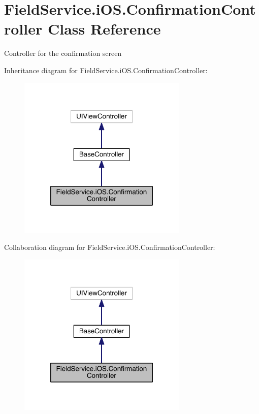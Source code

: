 \hypertarget{class_field_service_1_1i_o_s_1_1_confirmation_controller}{\section{Field\+Service.\+i\+O\+S.\+Confirmation\+Controller Class Reference}
\label{class_field_service_1_1i_o_s_1_1_confirmation_controller}
}


Controller for the confirmation screen  




Inheritance diagram for Field\+Service.\+i\+O\+S.\+Confirmation\+Controller\+:
\nopagebreak
\begin{figure}[H]
\begin{center}
\leavevmode
\includegraphics[width=228pt]{class_field_service_1_1i_o_s_1_1_confirmation_controller__inherit__graph}
\end{center}
\end{figure}


Collaboration diagram for Field\+Service.\+i\+O\+S.\+Confirmation\+Controller\+:
\nopagebreak
\begin{figure}[H]
\begin{center}
\leavevmode
\includegraphics[width=228pt]{class_field_service_1_1i_o_s_1_1_confirmation_controller__coll__graph}
\end{center}
\end{figure}

